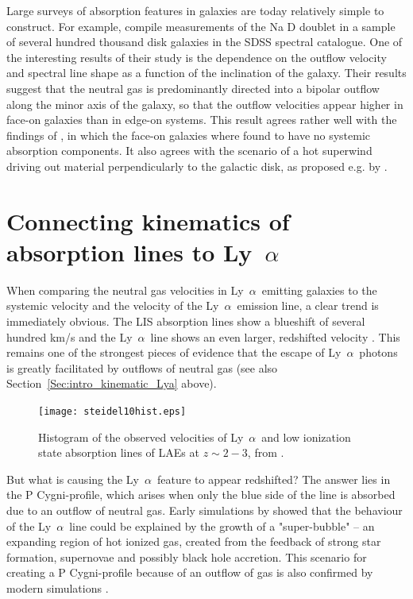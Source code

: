 \documentclass[a4wide,12pt]{book}
\newcommand{\lya}{Ly~${\alpha}$}
\begin{document}
{Large surveys of absorption features in galaxies are today relatively simple to construct. For example, \citet{chen-2010} compile measurements of the Na D doublet in a sample of several hundred thousand disk galaxies in the SDSS spectral catalogue. One of the interesting results of their study is the dependence on the outflow velocity and spectral line shape as a function of the inclination of the galaxy. Their results suggest that the neutral gas is predominantly directed into a bipolar outflow along the minor axis of the galaxy, so that the outflow velocities appear higher in face-on galaxies than in edge-on systems. This result agrees rather well with the findings of \citet{weiner-2009}, in which the face-on galaxies where found to have no systemic absorption components. It also agrees with the scenario of a hot superwind driving out material perpendicularly to the galactic disk, as proposed e.g. by \citet{heckman-2000}. 

\section{Connecting kinematics of absorption lines to \lya }\label{Sec:abslines_lya}

When comparing the neutral gas velocities in \lya\ emitting galaxies to the systemic velocity and the velocity of the \lya\ emission line, a clear trend is immediately obvious. The LIS absorption lines show a blueshift of several hundred km/s and the \lya\ line shows an even larger, redshifted velocity \citep[see Figure~\ref{Fig:steidel10hist} and][]{steidel-2010,pettini-2001}. This remains one of the strongest pieces of evidence that the escape of \lya\ photons is greatly facilitated by outflows of neutral gas (see also Section~\ref{Sec:intro_kinematic_Lya} above). 

\begin{figure}
   \centering
   \texttt{[image: steidel10hist.eps]}
   \caption{Histogram of the observed velocities of \lya\ and low ionization state absorption lines of LAEs at $z \sim 2-3$, from \citet{steidel-2010}. }
              \label{Fig:steidel10hist}
    \end{figure}

But what is causing the \lya\ feature to appear redshifted? The answer lies in the P Cygni-profile, which arises when only the blue side of the line is absorbed due to an outflow of neutral gas. Early simulations by \citet{tenorio-tagle1999} showed that the behaviour of the \lya\ line could be explained by the growth of a "super-bubble" -- an expanding region of hot ionized gas, created from the feedback of strong star formation, supernovae and possibly black hole accretion. This scenario for creating a P Cygni-profile because of an outflow of gas is also confirmed by modern simulations \citep[e.g.][]{verhamme-2006,garel-2012}. 


}
\end{document}
